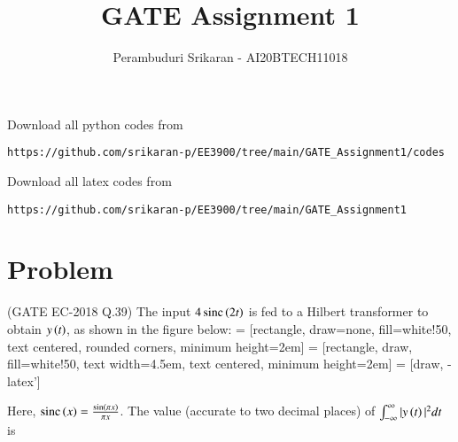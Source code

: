 \documentclass[journal,12pt,twocolumn]{IEEEtran}
\DeclareMathOperator{\sinc}{sinc}
\begin{document}
\makeatletter
{}
\makeatother
\let\StandardTheFigure\thefigure
\let\vec\mathbf
\renewcommand{\thefigure}{\theproblem}
\def\putbox#1#2#3{\makebox[0in][l]{\makebox[#1][l]{}\raisebox{\baselineskip}[0in][0in]{\raisebox{#2}[0in][0in]{#3}}}}
     \def\rightbox#1{\makebox[0in][r]{#1}}
     \def\centbox#1{\makebox[0in]{#1}}
     \def\topbox#1{\raisebox{-\baselineskip}[0in][0in]{#1}}
     \def\midbox#1{\raisebox{-0.5\baselineskip}[0in][0in]{#1}}
\vspace{3cm}
\title{GATE Assignment 1}
\author{Perambuduri Srikaran - AI20BTECH11018}
\maketitle
\newpage
\bigskip
\renewcommand{\thefigure}{\theenumi}
\renewcommand{\thetable}{\theenumi}
Download all python codes from
\begin{lstlisting}
https://github.com/srikaran-p/EE3900/tree/main/GATE_Assignment1/codes
\end{lstlisting}
Download all latex codes from
\begin{lstlisting}
https://github.com/srikaran-p/EE3900/tree/main/GATE_Assignment1
\end{lstlisting}
\section*{Problem}
(GATE EC-2018 Q.39) The input $4\sinc{\brak{2t}}$ is fed to a Hilbert transformer to obtain $y\left(t\right)$, as shown in the figure below:
 = [rectangle, draw=none, fill=white!50,
    text centered, rounded corners, minimum height=2em]
 = [rectangle, draw, fill=white!50,
    text width=4.5em, text centered, minimum height=2em]
 = [draw, -latex']
\begin{center}
\end{center}
Here, $\sinc{\brak{x}} = \frac{\sin\brak{\pi x}}{\pi x}$. The value (accurate to two decimal places) of $\int_{-\infty}^{\infty} |y\left(t\right)|^2 dt$ is
\end{document}
